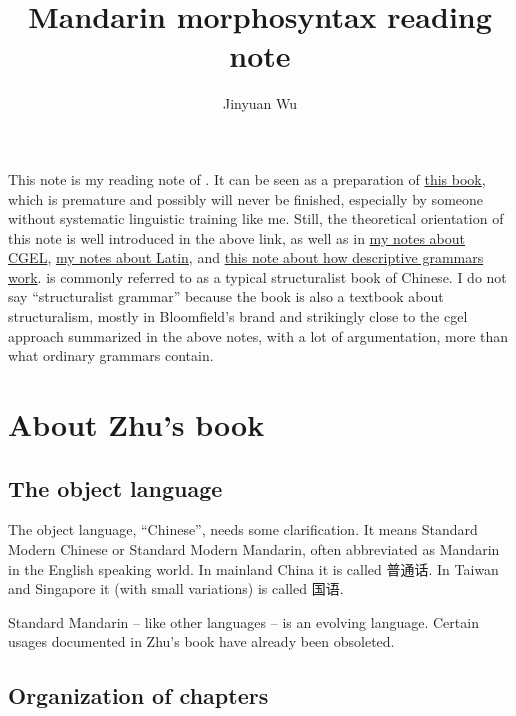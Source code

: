 \documentclass[UTF8, a4paper, oneside, scheme=plain]{ctexart}
\title{Mandarin morphosyntax reading note}
\author{Jinyuan Wu}
\newcommand{\cgel}{\href{../English/cambridge.pdf}{my notes about CGEL}}
\newcommand{\latin}{\href{../Latin/latin-notes.pdf}{my notes about Latin}}
\newcommand{\method}{\href{../methodology/glossing.pdf}{this note about how descriptive grammars work}}
\begin{document}
\maketitle

This note is my reading note of \citet{zhudexigrammar}.
It can be seen as a preparation of \href{./main.pdf}{this book},
which is premature and possibly will never be finished,
especially by someone without systematic linguistic training like me.
Still, the theoretical orientation of this note is well introduced in the above link,
as well as in \cgel, \latin, and \method.
\citet{zhudexigrammar} is commonly referred to as a typical structuralist book of Chinese.
I do not say ``structuralist grammar'' because the book is also a textbook about structuralism,
mostly in Bloomfield's brand
and strikingly close to the \ac{cgel} \citep{cgel} approach summarized in the above notes,
with a lot of argumentation, more than what ordinary grammars contain.

\section{About Zhu's book}

\subsection{The object language}

The object language, ``Chinese'', needs some clarification.
It means Standard Modern Chinese or Standard Modern Mandarin,
often abbreviated as Mandarin in the English speaking world.
In mainland China it is called 普通话.
In Taiwan and Singapore it (with small variations) is called 国语.

Standard Mandarin -- like other languages -- is an evolving language.
Certain usages documented in Zhu's book have already been obsoleted.

\subsection{Organization of chapters}
\end{document}
